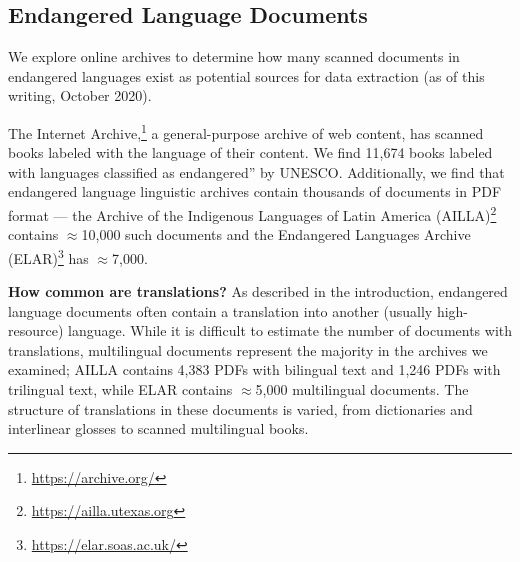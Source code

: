 \subsection{Endangered Language Documents}
We explore online archives to determine how many scanned documents in endangered languages exist as potential sources for data extraction (as of this writing, October 2020).

The Internet Archive,\footnote{\url{https://archive.org/}} a general-purpose archive of web content, has scanned books labeled with the language of their content. We find 11,674 books labeled with languages classified as \ba\ba endangered'' by UNESCO.
Additionally, we find that endangered language linguistic archives contain thousands of documents in PDF format --- the Archive of the Indigenous Languages of Latin America (AILLA)\footnote{\url{https://ailla.utexas.org}} contains $\approx$10,000 such documents and the Endangered Languages Archive (ELAR)\footnote{\url{https://elar.soas.ac.uk/}} has $\approx$7,000. 

\medskip
\noindent
\textbf{How common are translations?} As described in the introduction, endangered language documents often contain a translation into another (usually high-resource) language. While it is difficult to estimate the number of documents with translations, multilingual documents represent the majority in the archives we examined; AILLA contains 4,383 PDFs with bilingual text and 1,246 PDFs with trilingual text, while ELAR contains $\approx$5,000 multilingual documents. The structure of translations in these documents is varied, from dictionaries and interlinear glosses to scanned multilingual books.
